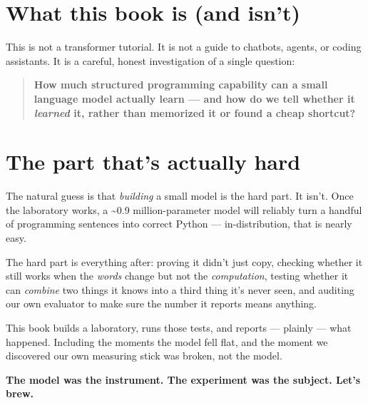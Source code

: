\section{What this book is (and
isn't)}\label{what-this-book-is-and-isnt}

This is not a transformer tutorial. It is not a guide to chatbots,
agents, or coding assistants. It is a careful, honest investigation of a
single question:

\begin{quote}
\textbf{How much structured programming capability can a small language
model actually learn --- and how do we tell whether it \emph{learned}
it, rather than memorized it or found a cheap shortcut?}
\end{quote}

\section{The part that's actually
hard}\label{the-part-thats-actually-hard}

The natural guess is that \emph{building} a small model is the hard
part. It isn't. Once the laboratory works, a \textasciitilde0.9
million-parameter model will reliably turn a handful of programming
sentences into correct Python --- in-distribution, that is nearly easy.

The hard part is everything after: proving it didn't just copy, checking
whether it still works when the \emph{words} change but not the
\emph{computation}, testing whether it can \emph{combine} two things it
knows into a third thing it's never seen, and auditing our own evaluator
to make sure the number it reports means anything.

This book builds a laboratory, runs those tests, and reports --- plainly
--- what happened. Including the moments the model fell flat, and the
moment we discovered our own measuring stick was broken, not the model.

\textbf{The model was the instrument. The experiment was the subject.
Let's brew.}
